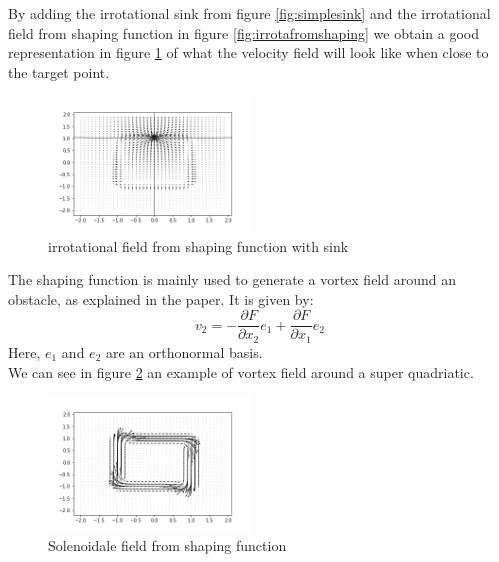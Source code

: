By adding the irrotational sink from figure \ref{fig:simplesink} and the irrotational field from shaping function in figure \ref{fig:irrotafromshaping} we obtain a good representation in figure \ref{fig:irrotafromshapingwithsink} of what the velocity field will look like when close to the target point. 
\begin{figure}[h!]
    \centering
    \includegraphics[width=0.48\textwidth]{Images/irrotashapingwithsink.png}
    \caption{irrotational field from shaping function with sink}
    \label{fig:irrotafromshapingwithsink}
\end{figure}

The shaping function is mainly used to generate a vortex field around an obstacle, as explained in the paper. It is given by: 
\begin{equation}
    v_2=-\frac{\partial{F}}{\partial{x_2}}e_1 + \frac{\partial{F}}{\partial{x_1}}e_2
\end{equation}
Here, $e_1$ and $e_2$ are an orthonormal basis. \\ 
We can see in figure \ref{fig:rotafromshaping} an example of vortex field around a super quadriatic.
\begin{figure}[h!]
    \centering
    \includegraphics[width=0.48\textwidth]{Images/rotafromshaping.png}
    \caption{Solenoidale field from shaping function}
    \label{fig:rotafromshaping}
\end{figure}
